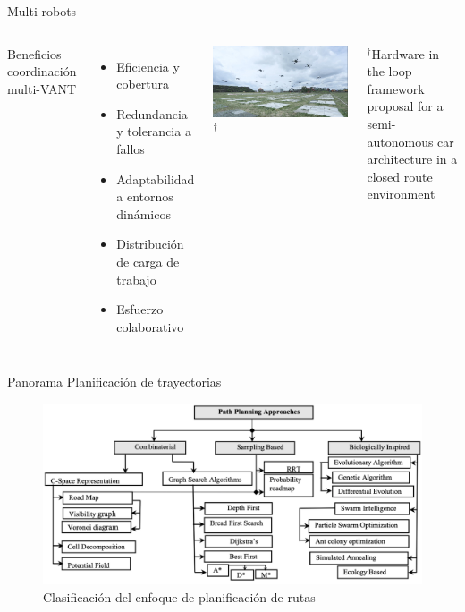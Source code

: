 \documentclass[
	12pt, %
	aspectratio=169, %
]{beamer}
\begin{document}
\begin{frame}{Multi-robots}
  \begin{columns}
    Beneficios coordinación multi-VANT
    \begin{itemize}
    \item Eficiencia y cobertura
    \item Redundancia y tolerancia a fallos
    \item Adaptabilidad a entornos dinámicos
    \item Distribución de carga de trabajo
    \item Esfuerzo colaborativo
    \end{itemize}
    \includegraphics[width=\textwidth]{drone_swarm}$^\dag$\\
    \rule{0in}{1.2em}$^\dag$\scriptsize Hardware in the loop framework proposal for a semi-autonomous car architecture in a closed route environment \cite{CurielRamirez2019}
  \end{columns}
\end{frame}

\begin{frame}{Panorama Planificación de trayectorias}
  \begin{figure}
    \centering
    \includegraphics[scale=0.33]{path_planning_panorama}
    \caption[Caption for LOF]{Clasificación del enfoque de planificación de rutas\footnotemark}
  \end{figure}
\end{frame}
\end{document}
